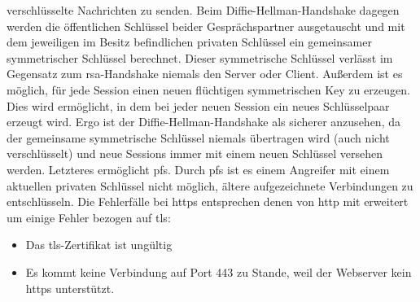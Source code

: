 \documentclass[titlepage]{report}
\begin{document}
verschlüsselte Nachrichten zu senden. Beim
Diffie\hyp{}Hellman\hyp{}Handshake dagegen werden die öffentlichen
Schlüssel beider Gesprächspartner ausgetauscht und mit dem jeweiligen im
Besitz befindlichen privaten Schlüssel ein gemeinsamer symmetrischer
Schlüssel berechnet. Dieser symmetrische Schlüssel verlässt im Gegensatz
zum \gls{rsa}\hyp{}Handshake niemals den Server oder Client. Außerdem
ist es möglich, für jede Session einen neuen flüchtigen symmetrischen Key
zu erzeugen. Dies wird ermöglicht, in dem bei jeder neuen Session ein
neues Schlüsselpaar erzeugt wird. Ergo ist der
Diffie\hyp{}Hellman\hyp{}Handshake als sicherer anzusehen, da der
gemeinsame symmetrische Schlüssel niemals übertragen wird (auch nicht
verschlüsselt) und neue Sessions immer mit einem neuen Schlüssel
versehen werden. Letzteres ermöglicht \gls{pfs}.  Durch \gls{pfs} ist es
einem Angreifer mit einem aktuellen privaten Schlüssel nicht möglich,
ältere aufgezeichnete Verbindungen zu entschlüsseln.
Die Fehlerfälle bei \gls{https} entsprechen denen von \gls{http} mit
erweitert um einige Fehler bezogen auf \gls{tls}:
\begin{itemize}
    \item Das \gls{tls}\hyp{}Zertifikat ist ungültig
    \item Es kommt keine Verbindung auf Port 443 zu Stande, weil der
          Webserver kein \gls{https} unterstützt.
\end{itemize}
\end{document}
